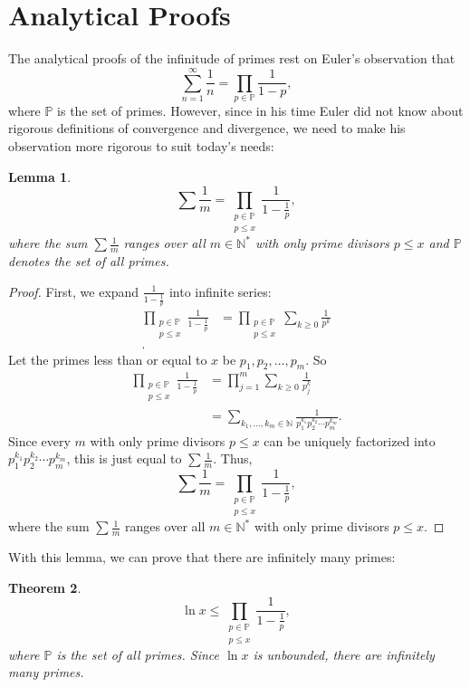 \documentclass[a4paper]{article}
\newtheorem{theorem}{Theorem}[section]
\newtheorem{lemma}[theorem]{Lemma}
\theoremstyle{definition}
\theoremstyle{remark}
\begin{document}
\section{Analytical Proofs}
\label{sec:analytical}
The analytical proofs of the infinitude of primes rest on Euler's observation that 
\[
\sum^\infty_{n=1}\frac{1}{n}=\prod_{p\in\mathbb{P}}\frac{1}{1-p}
,
\]
where $\mathbb{P}$ is the set of primes.
However, since in his time Euler did not know about rigorous definitions of convergence and divergence, we need to make his observation more rigorous to suit today's needs:
\begin{lemma}
  \[
  \sum\frac{1}{m}=\prod\limits_{\substack{p\in\mathbb{P}\\p\le x}}\frac{1}{1-\frac{1}{p}}
  ,
  \]
  where the sum $\sum\frac{1}{m}$ ranges over all $m\in\mathbb{N^*}$ with only prime divisors $p\le x$ and $\mathbb{P}$ denotes the set of all primes.
  \label{lem:EulerProduct}
\end{lemma}
\begin{proof}
  First, we expand $\frac{1}{1-\frac{1}{p}}$ into infinite series:
  \begin{align*}
    \prod\limits_{\substack{p\in\mathbb{P}\\p\le x}}\frac{1}{1-\frac{1}{p}}&=\prod\limits_{\substack{p\in\mathbb{P}\\p\le x}}\sum_{k\ge0}\frac{1}{p^k}\\
    .
  \end{align*}
  Let the primes less than or equal to $x$ be $p_1,p_2,\dots,p_m$. So
  \begin{align*}
    \prod\limits_{\substack{p\in\mathbb{P}\\p\le x}}\frac{1}{1-\frac{1}{p}}&=\prod\limits_{j=1}^m\sum_{k\ge0}\frac{1}{p_j^k}\\
    &=\sum\limits_{k_1,\dots,k_m\in\mathbb{N}}\frac{1}{p_1^{k_1}p_2^{k_2}\cdots p_m^{k_m}}
    .
  \end{align*}
  Since every $m$ with only prime divisors $p\le x$ can be uniquely factorized into $p_1^{k_1}p_2^{k_2}\cdots p_m^{k_m}$, this is just equal to $\sum\frac{1}{m}$. Thus,
  \[
  \sum\frac{1}{m}=\prod\limits_{\substack{p\in\mathbb{P}\\p\le x}}\frac{1}{1-\frac{1}{p}}
  ,
  \]
  where the sum $\sum\frac{1}{m}$ ranges over all $m\in\mathbb{N^*}$ with only prime divisors $p\le x$.
\end{proof}
With this lemma, we can prove that there are infinitely many primes:
\begin{theorem}
  \[
  \ln x\le \prod\limits_{\substack{p\in\mathbb{P}\\p\le x}}\frac{1}{1-\frac{1}{p}}
  ,
  \]
  where $\mathbb{P}$ is the set of all primes. Since $\ln x$ is unbounded, there are infinitely many primes.
  \label{thm:EulerInfinitePrimes}
\end{theorem}
\end{document}
